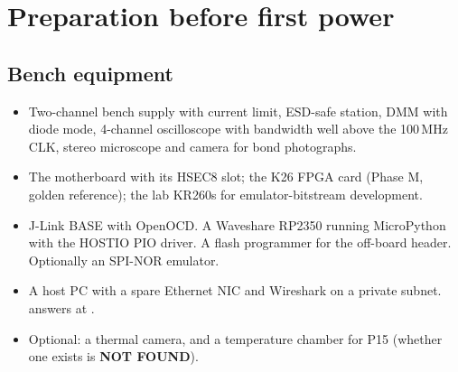 \documentclass[10pt,a4paper]{article}
\newcommand\NF{\textcolor{warn}{\textbf{NOT FOUND}}}
\begin{document}
\section{Preparation before first power}\label{sec:prep}
\subsection{Bench equipment}
\begin{itemize}
\item Two-channel bench supply with current limit, ESD-safe station, DMM with diode mode, 4-channel oscilloscope with bandwidth well above the 100\,MHz CLK, stereo microscope and camera for bond photographs.
\item The motherboard with its HSEC8 slot; the K26 FPGA card (Phase M, golden reference); the lab KR260s for emulator-bitstream development.
\item J-Link BASE with OpenOCD. A Waveshare RP2350 running MicroPython with the HOSTIO PIO driver. A flash programmer for the off-board header. Optionally an SPI-NOR emulator.
\item A host PC with a spare Ethernet NIC and Wireshark on a private subnet.  answers at .
\item Optional: a thermal camera, and a temperature chamber for P15 (whether one exists is \NF).
\end{itemize}
\end{document}
